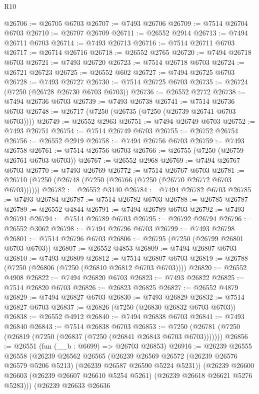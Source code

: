 \begin{lexlean}{R10}
\begin{coremodule}
@26706 := @26705 @6703
@26707 := @7493 @26706
@26709 := @7514 @26704 @6703
@26710 := @26707 @26709
@26711 := @26552 @2914
@26713 := @7494 @26711 @6703
@26714 := @7493 @26713
@26716 := @7514 @26711 @6703
@26717 := @26714 @26716
@26718 := @26552 @2765
@26720 := @7494 @26718 @6703
@26721 := @7493 @26720
@26723 := @7514 @26718 @6703
@26724 := @26721 @26723
@26725 := @26552 @602
@26727 := @7494 @26725 @6703
@26728 := @7493 @26727
@26730 := @7514 @26725 @6703
@26735 := @26724 (@7250 (@26728 @26730 @6703 @6703))
@26736 := @26552 @2772
@26738 := @7494 @26736 @6703
@26739 := @7493 @26738
@26741 := @7514 @26736 @6703
@26748 := @26717 (@7250 (@26735 (@7250 (@26739 @26741 @6703 @6703))))
@26749 := @26552 @2963
@26751 := @7494 @26749 @6703
@26752 := @7493 @26751
@26754 := @7514 @26749 @6703
@26755 := @26752 @26754
@26756 := @26552 @2919
@26758 := @7494 @26756 @6703
@26759 := @7493 @26758
@26761 := @7514 @26756 @6703
@26766 := @26755 (@7250 (@26759 @26761 @6703 @6703))
@26767 := @26552 @2968
@26769 := @7494 @26767 @6703
@26770 := @7493 @26769
@26772 := @7514 @26767 @6703
@26781 := @26710 (@7250 (@26748 (@7250 (@26766 (@7250 (@26770 @26772 @6703 @6703))))))
@26782 := @26552 @3140
@26784 := @7494 @26782 @6703
@26785 := @7493 @26784
@26787 := @7514 @26782 @6703
@26788 := @26785 @26787
@26789 := @26552 @4844
@26791 := @7494 @26789 @6703
@26792 := @7493 @26791
@26794 := @7514 @26789 @6703
@26795 := @26792 @26794
@26796 := @26552 @3062
@26798 := @7494 @26796 @6703
@26799 := @7493 @26798
@26801 := @7514 @26796 @6703
@26806 := @26795 (@7250 (@26799 @26801 @6703 @6703))
@26807 := @26552 @4853
@26809 := @7494 @26807 @6703
@26810 := @7493 @26809
@26812 := @7514 @26807 @6703
@26819 := @26788 (@7250 (@26806 (@7250 (@26810 @26812 @6703 @6703))))
@26820 := @26552 @4908
@26822 := @7494 @26820 @6703
@26823 := @7493 @26822
@26825 := @7514 @26820 @6703
@26826 := @26823 @26825
@26827 := @26552 @4879
@26829 := @7494 @26827 @6703
@26830 := @7493 @26829
@26832 := @7514 @26827 @6703
@26837 := @26826 (@7250 (@26830 @26832 @6703 @6703))
@26838 := @26552 @4912
@26840 := @7494 @26838 @6703
@26841 := @7493 @26840
@26843 := @7514 @26838 @6703
@26853 := @7250 (@26781 (@7250 (@26819 (@7250 (@26837 (@7250 (@26841 @26843 @6703 @6703)))))))
@26856 := @26551 (fun (__b : @6699) => @26703 @26853)
@26916 := @26239
    @26555
    @26558
    (@26239
      @26562
      @26565
      (@26239 @26569 @26572 (@26239 @26576 @26579 @5206 @5213) (@26239 @26587 @26590 @5224 @5231))
      (@26239 @26600 @26603 (@26239 @26607 @26610 @5254 @5261) (@26239 @26618 @26621 @5276 @5283)))
    (@26239
      @26633
      @26636

\end{coremodule}
\end{lexlean}
